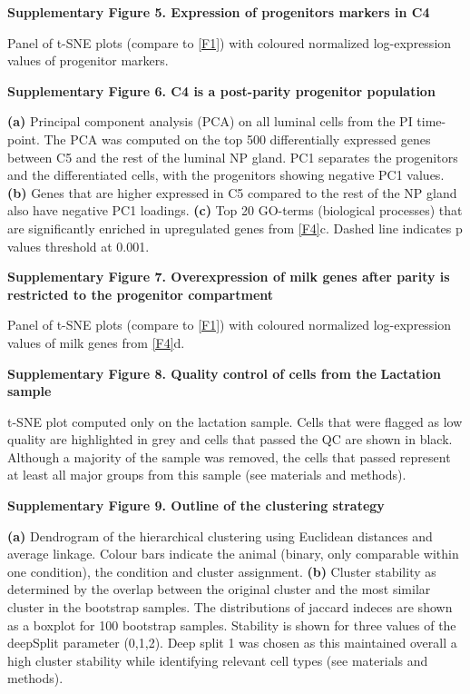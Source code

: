 \documentclass[titlepage, 12pt, oneside]{amsart}
\begin{document}
\textbf{Supplementary Figure 5. Expression of progenitors markers in C4}

Panel of t-SNE plots (compare to \autoref{F1}) with coloured normalized log-expression values of progenitor markers.

\textbf{Supplementary Figure 6. C4 is a post-parity progenitor
population }

\textbf{(a)} Principal component analysis (PCA) on all luminal cells from the PI time-point.
The PCA was computed on the top 500 differentially expressed genes between C5 and the rest of the luminal NP gland.
PC1 separates the progenitors and the differentiated cells, with the progenitors showing negative PC1 values.
\textbf{(b)} Genes that are higher expressed in C5 compared to the rest of the NP gland also have negative PC1 loadings.
\textbf{(c)} Top 20 GO-terms (biological processes) that are significantly enriched in upregulated genes from \autoref{F4}c.
Dashed line indicates p values threshold at 0.001.

\textbf{Supplementary Figure 7. Overexpression of milk genes after
parity is restricted to the progenitor compartment}

Panel of t-SNE plots (compare to \autoref{F1}) with coloured normalized log-expression values of milk genes from \autoref{F4}d.

\textbf{Supplementary Figure 8. Quality control of cells from the}
\textbf{Lactation sample}

t-SNE plot computed only on the lactation sample.
Cells that were flagged as low quality are highlighted in grey and cells that passed the QC are shown in black.
Although a majority of the sample was removed, the cells that passed represent at least all major groups from this sample (see materials and methods).

\textbf{Supplementary Figure 9. Outline of the clustering strategy }

\textbf{(a)} Dendrogram of the hierarchical clustering using Euclidean distances and average linkage.
Colour bars indicate the animal (binary, only comparable within one condition), the condition and cluster assignment.
\textbf{(b)} Cluster stability as determined by the overlap between the original cluster and the most similar cluster in the bootstrap samples.
The distributions of jaccard indeces are shown as a boxplot for 100 bootstrap samples.
Stability is shown for three values of the deepSplit parameter (0,1,2).
Deep split 1 was chosen as this maintained overall a high cluster stability while identifying relevant cell types (see materials and methods).
\end{document}
